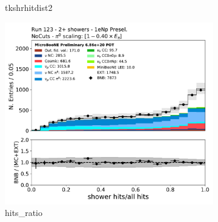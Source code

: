\begin{figure}[H]
\begin{subfigure}{0.3\textwidth}
    \caption{tkshrhitdist2}
    \end{subfigure}
    \begin{subfigure}{0.3\textwidth}
    \includegraphics[width=1.0\textwidth]{Sidebands/Figures/1eNp/TwoShower/TwoPShr_NP_None_pi0e040/hits_ratio.pdf}
    \caption{hits\_ratio}
    \end{subfigure}
    \caption{} 
    \label{fig:TWOP_1eNp_3}
\end{figure}

